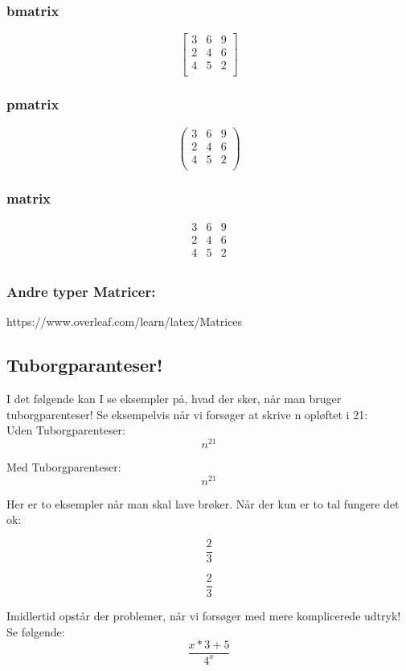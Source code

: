\subsubsection*{bmatrix}
\[\begin{bmatrix}
    3 & 6 & 9\\
    2 & 4 & 6\\
    4 & 5 & 2\\
\end{bmatrix}\]

\subsubsection*{pmatrix}
\[\begin{pmatrix}
    3 & 6 & 9\\
    2 & 4 & 6\\
    4 & 5 & 2\\
\end{pmatrix}\]
\subsubsection*{matrix}
\[\begin{matrix}
    3 & 6 & 9\\
    2 & 4 & 6\\
    4 & 5 & 2\\
\end{matrix}\]
\subsubsection*{Andre typer Matricer:}
https://www.overleaf.com/learn/latex/Matrices




\subsection*{Tuborgparanteser!}
I det følgende kan I se eksempler på, hvad der sker, når man bruger tuborgparenteser! Se eksempelvis når vi forsøger at skrive n opløftet i 21: \\

Uden Tuborgparenteser:
\[n^21\]

Med Tuborgparenteser:
\[n^{21}\]

Her er to eksempler når man skal lave brøker. Når der kun er to tal fungere det ok:

\[\frac{2}{3}\]


\[\frac 2 3\]


Imidlertid opstår der problemer, når vi forsøger med mere komplicerede udtryk! Se følgende:
\[\frac{x*3+5}{4^x}\]

